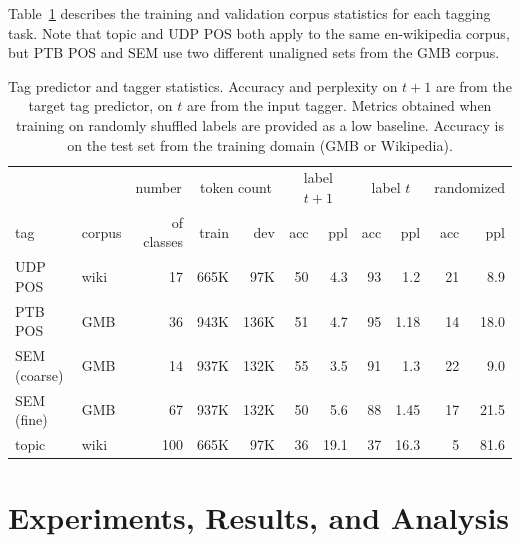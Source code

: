 Table~\ref{fig:corpus_stats} describes the training and validation corpus statistics for each tagging task. Note that topic and UDP POS both apply to the same en-wikipedia corpus, but PTB POS and SEM use two different unaligned sets from the GMB corpus.

\begin{table}
\centering\small
\begin{tabular}{l||l|r|rr|rr|rr|rr}
 &  & \multicolumn{1}{|l|}{number}  & \multicolumn{2}{|c|}{token count}  & \multicolumn{2}{|c|}{label $t+1$} & \multicolumn{2}{|c|}{label $t$} & \multicolumn{2}{|c}{randomized}\\
tag & corpus & of classes & train & dev  & acc & ppl  & acc & ppl & acc & ppl \\
\hline
UDP POS & wiki & 17 & 665K & 97K &  50 & 4.3    & 93 & 1.2 & 21 & 8.9\\
PTB POS & GMB & 36 & 943K & 136K & 51 & 4.7 & 95 & 1.18 & 14 & 18.0 \\
SEM (coarse) & GMB & 14 & 937K & 132K &  55 & 3.5 & 91 & 1.3 & 22 & 9.0 \\
SEM (fine) & GMB & 67 & 937K & 132K &  50 & 5.6 & 88 & 1.45 & 17 & 21.5   \\
topic & wiki & 100 & 665K & 97K  & 36 & 19.1 & 37 & 16.3 & 5 & 81.6\\
\end{tabular}
\caption{Tag predictor and tagger statistics. Accuracy and perplexity on $t+1$ are from the target tag predictor, on $t$ are from the input tagger. Metrics obtained when training on randomly shuffled labels are provided as a low baseline. Accuracy is on the test set from the training domain (GMB or Wikipedia).}
\label{fig:corpus_stats}
\end{table}

\section{Experiments, Results, and Analysis}

